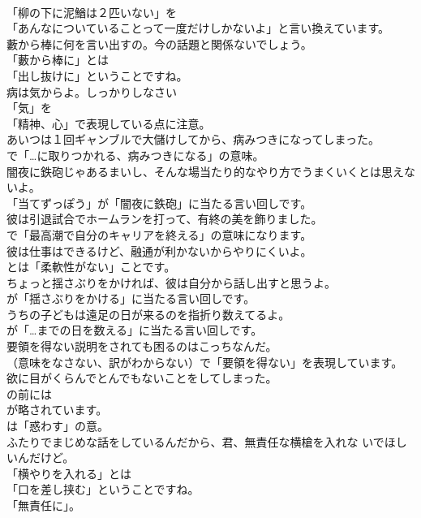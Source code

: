 \documentclass[8pt]{extreport}
\begin{document}
\begin{CJK}{UTF8}{min}
\\	「柳の下に泥鰌は２匹いない」を
\\	「あんなについていることって一度だけしかないよ」と言い換えています。	
\\	藪から棒に何を言い出すの。今の話題と関係ないでしょう。 
\\	「藪から棒に」とは
\\	「出し抜けに」ということですね。	
\\	病は気からよ。しっかりしなさい 
\\	「気」を
\\	「精神、心」で表現している点に注意。	
\\	あいつは１回ギャンブルで大儲けしてから、病みつきになってしまった。 
\\	で「…に取りつかれる、病みつきになる」の意味。	
\\	闇夜に鉄砲じゃあるまいし、そんな場当たり的なやり方でうまくいくとは思えないよ。 
\\	「当てずっぽう」が「闇夜に鉄砲」に当たる言い回しです。	
\\	彼は引退試合でホームランを打って、有終の美を飾りました。 
\\	で「最高潮で自分のキャリアを終える」の意味になります。	
\\	彼は仕事はできるけど、融通が利かないからやりにくいよ。 
\\	とは「柔軟性がない」ことです。	
\\	ちょっと揺さぶりをかければ、彼は自分から話し出すと思うよ。 
\\	が「揺さぶりをかける」に当たる言い回しです。	
\\	うちの子どもは遠足の日が来るのを指折り数えてるよ。 
\\	が「…までの日を数える」に当たる言い回しです。	
\\	要領を得ない説明をされても困るのはこっちなんだ。 
\\	（意味をなさない、訳がわからない）で「要領を得ない」を表現しています。	
\\	欲に目がくらんでとんでもないことをしてしまった。 
\\	の前には 
\\	が略されています。
\\	は「惑わす」の意。	
\\	ふたりでまじめな話をしているんだから、君、無責任な横槍を入れな いでほしいんだけど。 
\\	「横やりを入れる」とは
\\	「口を差し挟む」ということですね。
\\	「無責任に」。	

\end{CJK}
\end{document}
